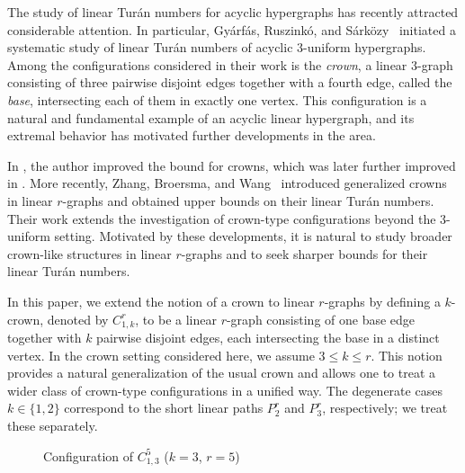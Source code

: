\documentclass[12pt]{article}
\begin{document}
The study of linear Tur\'an numbers for acyclic hypergraphs has recently attracted considerable attention. In particular, Gy\'arf\'as, Ruszink\'o, and S\'ark\"ozy~\cite{gyarfas2022linear} initiated a systematic study of linear Tur\'an numbers of acyclic $3$-uniform hypergraphs. Among the configurations considered in their work is the \emph{crown}, a linear $3$-graph consisting of three pairwise disjoint edges together with a fourth edge, called the \textit{base}, intersecting each of them in exactly one vertex. This configuration is a natural and fundamental example of an acyclic linear hypergraph, and its extremal behavior has motivated further developments in the area.

In \cite{fletcher2021improved}, the author improved the bound for crowns, which was later further improved in \cite{tang2022turan}. More recently, Zhang, Broersma, and Wang~\cite{zhang2025generalized} introduced generalized crowns in linear $r$-graphs and obtained upper bounds on their linear Tur\'an numbers. Their work extends the investigation of crown-type configurations beyond the $3$-uniform setting. Motivated by these developments, it is natural to study broader crown-like structures in linear $r$-graphs and to seek sharper bounds for their linear Tur\'an numbers.

In this paper, we extend the notion of a crown to linear $r$-graphs by defining a $k$-crown, denoted by $C_{1,k}^r$, to be a linear $r$-graph consisting of one base edge together with $k$ pairwise disjoint edges, each intersecting the base in a distinct vertex. In the crown setting considered here, we assume $3\leq k \leq r$. This notion provides a natural generalization of the usual crown and allows one to treat a wider class of crown-type configurations in a unified way. The degenerate cases $k\in\{1,2\}$ correspond to the short linear paths $P_2^r$ and $P_3^r$, respectively; we treat these separately.

\begin{figure}[ht]
    \centering
\caption{Configuration of $C_{1,3}^5$ ($k =3$, $r =5$)}
\end{figure}
\end{document}
